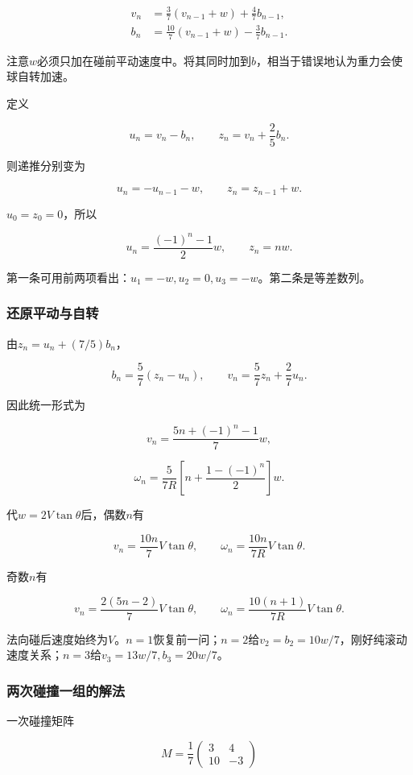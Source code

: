 \documentclass[12pt,a4paper,fontset=fandol]{ctexart}
\begin{document}
\[
\begin{aligned}
v_n&=\frac37(v_{n-1}+w)+\frac47b_{n-1},\\
b_n&=\frac{10}{7}(v_{n-1}+w)-\frac37b_{n-1}.
\end{aligned}
\]

注意\(w\)必须只加在碰前平动速度中。将其同时加到\(b\)，相当于错误地认为重力会使球自转加速。

定义

\[
u_n=v_n-b_n,\qquad
z_n=v_n+\frac25b_n.
\]

则递推分别变为

\[
u_n=-u_{n-1}-w,
\qquad z_n=z_{n-1}+w.
\]

\(u_0=z_0=0\)，所以

\[
u_n=\frac{(-1)^n-1}{2}w,
\qquad z_n=nw.
\]

第一条可用前两项看出：\(u_1=-w,u_2=0,u_3=-w\)。第二条是等差数列。

\subsubsection{还原平动与自转}\label{ux8fd8ux539fux5e73ux52a8ux4e0eux81eaux8f6c}

由\(z_n=u_n+(7/5)b_n\)，

\[
b_n=\frac57(z_n-u_n),
\qquad
v_n=\frac57z_n+\frac27u_n.
\]

因此统一形式为

\[
\boxed{v_n=\frac{5n+(-1)^n-1}{7}w},
\]

\[
\boxed{
\omega_n=\frac{5}{7R}
\left[n+\frac{1-(-1)^n}{2}\right]w}.
\]

代\(w=2V\tan\theta\)后，偶数\(n\)有

\[
\boxed{v_n=\frac{10n}{7}V\tan\theta,\qquad
\omega_n=\frac{10n}{7R}V\tan\theta}.
\]

奇数\(n\)有

\[
\boxed{v_n=\frac{2(5n-2)}7V\tan\theta,\qquad
\omega_n=\frac{10(n+1)}{7R}V\tan\theta}.
\]

法向碰后速度始终为\(V\)。\(n=1\)恢复前一问；\(n=2\)给\(v_2=b_2=10w/7\)，刚好纯滚动速度关系；\(n=3\)给\(v_3=13w/7,b_3=20w/7\)。

\subsubsection{两次碰撞一组的解法}\label{ux4e24ux6b21ux78b0ux649eux4e00ux7ec4ux7684ux89e3ux6cd5}

一次碰撞矩阵

\[
M=\frac17
\begin{pmatrix}3&4\\10&-3\end{pmatrix}
\]
\end{document}

